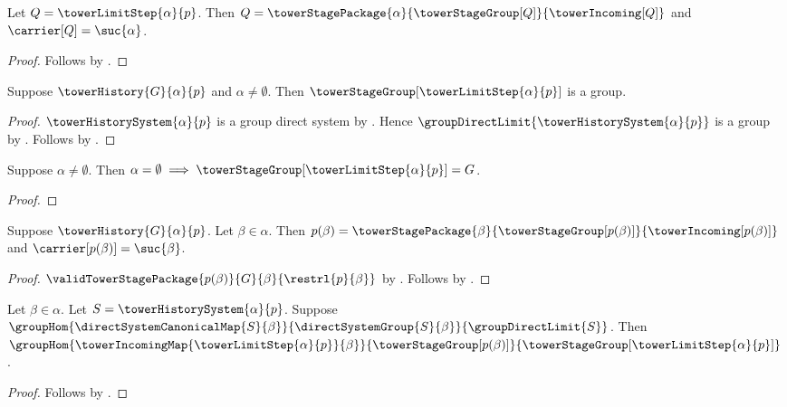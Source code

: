 \begin{proposition}\label{tower_limit_step_exact_data}
    Let $Q=\towerLimitStep{\alpha}{p}$.
    Then $Q=\towerStagePackage{\alpha}
            {\towerStageGroup[Q]}{\towerIncoming[Q]}$ and
        $\carrier[Q]=\suc{\alpha}$.
\end{proposition}
\begin{proof}
    Follows by
        .
\end{proof}

\begin{proposition}\label{tower_limit_step_group_is_group}
    Suppose $\towerHistory{G}{\alpha}{p}$ and
        $\alpha\neq\emptyset$.
    Then $\towerStageGroup[\towerLimitStep{\alpha}{p}]$ is a group.
\end{proposition}
\begin{proof}
    $\towerHistorySystem{\alpha}{p}$ is a group direct system by
        .
    Hence $\groupDirectLimit{\towerHistorySystem{\alpha}{p}}$
        is a group by .
    Follows by .
\end{proof}

\begin{proposition}\label{tower_limit_step_base_vacuous}
    Suppose $\alpha\neq\emptyset$.
    Then $\alpha=\emptyset\implies
        \towerStageGroup[\towerLimitStep{\alpha}{p}]=G$.
\end{proposition}
\begin{proof}
\end{proof}

\begin{proposition}\label{tower_limit_history_shape}
    Suppose $\towerHistory{G}{\alpha}{p}$.
    Let $\beta\in\alpha$.
    Then $p(\beta)=\towerStagePackage{\beta}
            {\towerStageGroup[p(\beta)]}{\towerIncoming[p(\beta)]}$ and
        $\carrier[p(\beta)]=\suc{\beta}$.
\end{proposition}
\begin{proof}
    $\validTowerStagePackage
        {p(\beta)}{G}{\beta}{\restrl{p}{\beta}}$ by
        .
    Follows by .
\end{proof}

\begin{proposition}\label{tower_limit_step_incoming_hom_bridge}
    Let $\beta\in\alpha$.
    Let $S=\towerHistorySystem{\alpha}{p}$.
    Suppose $\groupHom
        {\directSystemCanonicalMap{S}{\beta}}
        {\directSystemGroup{S}{\beta}}
        {\groupDirectLimit{S}}$.
    Then $\groupHom
        {\towerIncomingMap{\towerLimitStep{\alpha}{p}}{\beta}}
        {\towerStageGroup[p(\beta)]}
        {\towerStageGroup[\towerLimitStep{\alpha}{p}]}$.
\end{proposition}
\begin{proof}
    Follows by
        .
\end{proof}

